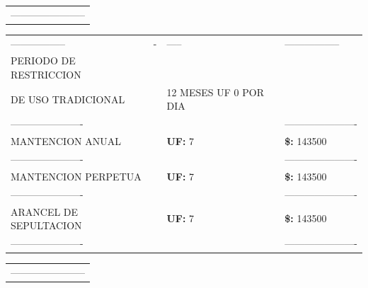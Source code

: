 \documentclass[10pt]{article}
\begin{document}
\begin{tabular}{l}
\color{white}----------------------- \\
\end{tabular}

\begin{tabular}{llll}
\hline
\color{white}----------------- & \color{white}- & \color{white}-----  & \color{white}----------------- \\
PERIODO DE RESTRICCION & & &\\ 
DE USO TRADICIONAL  & & 12 MESES UF 0 POR DIA \\ 
\color{white}---------------------- & & & \color{white}---------------------- \\
MANTENCION ANUAL &  & \textbf{UF: }7& \textbf{\$: }143500 \\  
\color{white}---------------------- & & & \color{white}---------------------- \\
MANTENCION PERPETUA &  & \textbf{UF: }7 & \textbf{\$: }143500 \\  
\color{white}---------------------- & & & \color{white}---------------------- \\
ARANCEL DE SEPULTACION &  & \textbf{UF: } 7& \textbf{\$: } 143500 \\  
\color{white}---------------------- & & & \color{white}---------------------- \\
\hline
\end{tabular}

\begin{tabular}{l}
\color{white}----------------------- \\
\end{tabular}
\end{document}
